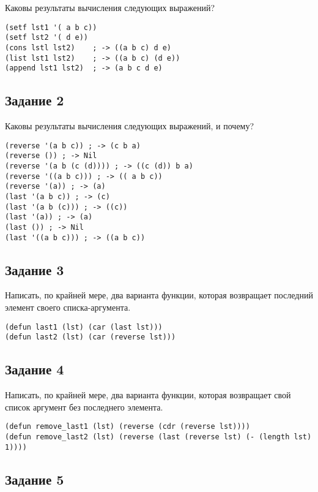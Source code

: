 Каковы результаты вычисления следующих выражений?

\begin{lstlisting}
(setf lst1 '( a b c))
(setf lst2 '( d e))
(cons lstl lst2)    ; -> ((a b c) d e)
(list lst1 lst2)    ; -> ((a b c) (d e))
(append lst1 lst2)  ; -> (a b c d e)
\end{lstlisting}

\subsection*{Задание 2}

Каковы результаты вычисления следующих выражений, и почему?

\begin{lstlisting}
(reverse '(a b c)) ; -> (c b a)
(reverse ()) ; -> Nil
(reverse '(a b (c (d)))) ; -> ((c (d)) b a)
(reverse '((a b c))) ; -> (( a b c))
(reverse '(a)) ; -> (a)
(last '(a b c)) ; -> (c)
(last '(a b (c))) ; -> ((c))
(last '(a)) ; -> (a)
(last ()) ; -> Nil
(last '((a b c))) ; -> ((a b c))
\end{lstlisting}

\subsection*{Задание 3}

Написать, по крайней мере, два варианта функции, которая возвращает последний элемент своего списка-аргумента. 

\begin{lstlisting}
(defun last1 (lst) (car (last lst)))
(defun last2 (lst) (car (reverse lst)))
\end{lstlisting}

\subsection*{Задание 4}

Написать, по крайней мере, два варианта функции, которая возвращает свой список аргумент без последнего элемента. 

\begin{lstlisting}
(defun remove_last1 (lst) (reverse (cdr (reverse lst))))
(defun remove_last2 (lst) (reverse (last (reverse lst) (- (length lst) 1))))
\end{lstlisting}

\subsection*{Задание 5}

